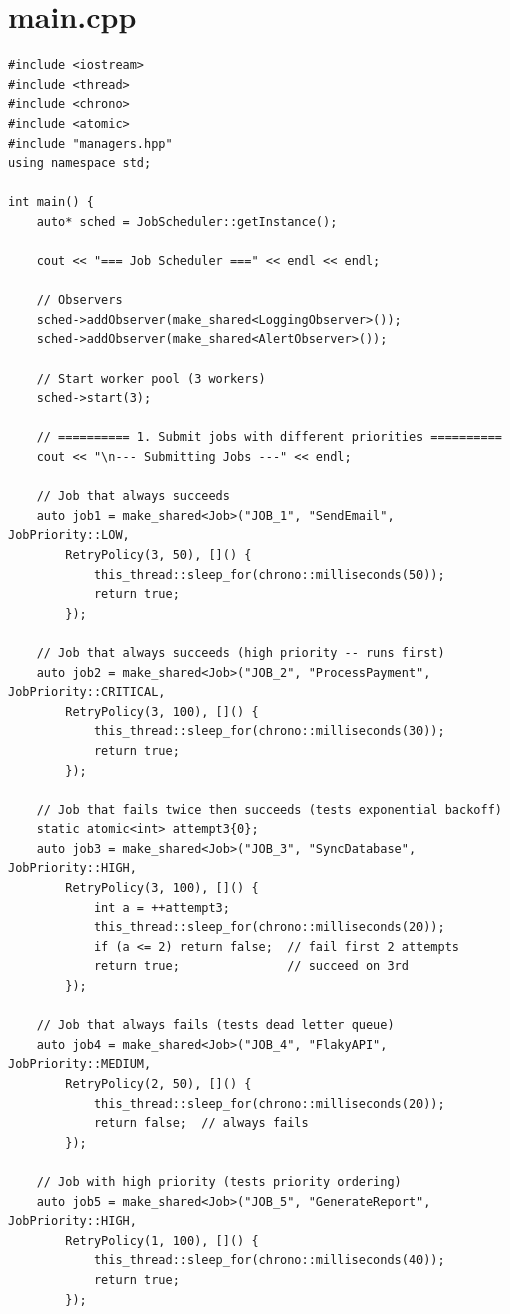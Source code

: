 \documentclass[11pt,a4paper]{article}
\begin{document}
\section{main.cpp}
\begin{lstlisting}[title={\texttt{main.cpp}}]
#include <iostream>
#include <thread>
#include <chrono>
#include <atomic>
#include "managers.hpp"
using namespace std;

int main() {
    auto* sched = JobScheduler::getInstance();

    cout << "=== Job Scheduler ===" << endl << endl;

    // Observers
    sched->addObserver(make_shared<LoggingObserver>());
    sched->addObserver(make_shared<AlertObserver>());

    // Start worker pool (3 workers)
    sched->start(3);

    // ========== 1. Submit jobs with different priorities ==========
    cout << "\n--- Submitting Jobs ---" << endl;

    // Job that always succeeds
    auto job1 = make_shared<Job>("JOB_1", "SendEmail", JobPriority::LOW,
        RetryPolicy(3, 50), []() {
            this_thread::sleep_for(chrono::milliseconds(50));
            return true;
        });

    // Job that always succeeds (high priority -- runs first)
    auto job2 = make_shared<Job>("JOB_2", "ProcessPayment", JobPriority::CRITICAL,
        RetryPolicy(3, 100), []() {
            this_thread::sleep_for(chrono::milliseconds(30));
            return true;
        });

    // Job that fails twice then succeeds (tests exponential backoff)
    static atomic<int> attempt3{0};
    auto job3 = make_shared<Job>("JOB_3", "SyncDatabase", JobPriority::HIGH,
        RetryPolicy(3, 100), []() {
            int a = ++attempt3;
            this_thread::sleep_for(chrono::milliseconds(20));
            if (a <= 2) return false;  // fail first 2 attempts
            return true;               // succeed on 3rd
        });

    // Job that always fails (tests dead letter queue)
    auto job4 = make_shared<Job>("JOB_4", "FlakyAPI", JobPriority::MEDIUM,
        RetryPolicy(2, 50), []() {
            this_thread::sleep_for(chrono::milliseconds(20));
            return false;  // always fails
        });

    // Job with high priority (tests priority ordering)
    auto job5 = make_shared<Job>("JOB_5", "GenerateReport", JobPriority::HIGH,
        RetryPolicy(1, 100), []() {
            this_thread::sleep_for(chrono::milliseconds(40));
            return true;
        });


\end{lstlisting}
\end{document}
